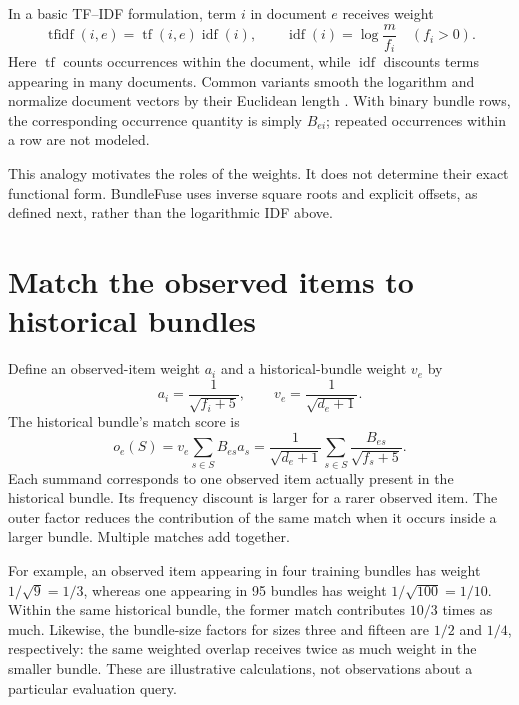 \documentclass[11pt,a4paper]{article}
\begin{document}
In a basic TF--IDF formulation, term $i$ in document $e$ receives weight
\begin{equation}
 \operatorname{tfidf}(i,e)=\operatorname{tf}(i,e)
                         \operatorname{idf}(i),\qquad
 \operatorname{idf}(i)=\log\frac{m}{f_i}\quad(f_i>0).
\end{equation}
Here $\operatorname{tf}$ counts occurrences within the document, while
$\operatorname{idf}$ discounts terms appearing in many documents. Common variants
smooth the logarithm and normalize document vectors by their Euclidean length
\cite{tfidf}. With binary bundle rows, the corresponding occurrence quantity is
simply $B_{ei}$; repeated occurrences within a row are not modeled.

This analogy motivates the roles of the weights. It does not determine their
exact functional form. BundleFuse uses inverse square roots and explicit offsets,
as defined next, rather than the logarithmic IDF above.

\section{Match the observed items to historical bundles}
Define an observed-item weight $a_i$ and a historical-bundle weight $v_e$ by
\begin{equation}
 a_i=\frac1{\sqrt{f_i+5}},\qquad
 v_e=\frac1{\sqrt{d_e+1}}.
\end{equation}
The historical bundle's match score is
\begin{equation}\label{overlap}
 \boxed{o_e(S)=v_e\sum_{s\in S}B_{es}a_s
 =\frac1{\sqrt{d_e+1}}
   \sum_{s\in S}\frac{B_{es}}{\sqrt{f_s+5}}.}
\end{equation}
Each summand corresponds to one observed item actually present in the historical
bundle. Its frequency discount is larger for a rarer observed item. The outer
factor reduces the contribution of the same match when it occurs inside a larger
bundle. Multiple matches add together.

For example, an observed item appearing in four training bundles has weight
$1/\sqrt9=1/3$, whereas one appearing in 95 bundles has weight
$1/\sqrt{100}=1/10$. Within the same historical bundle, the former match
contributes $10/3$ times as much. Likewise, the bundle-size factors for sizes
three and fifteen are $1/2$ and $1/4$, respectively: the same weighted overlap
receives twice as much weight in the smaller bundle. These are illustrative
calculations, not observations about a particular evaluation query.
\end{document}
